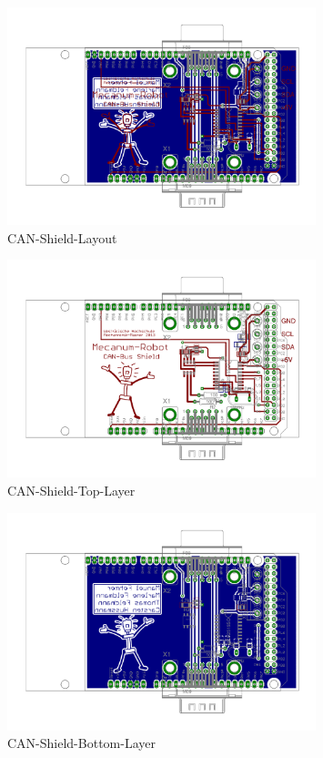 \begin{figure}[H]
\centering
 \includegraphics[width=0.8\textwidth]{Abbildungen/CAN-Shield-Layout} 
\caption[CAN-Shield-Layout]{CAN-Shield-Layout}
\label{fig:CAN-Shield-Layout}
\end{figure}

\begin{figure}[H]
\centering
 \includegraphics[width=0.8\textwidth]{Abbildungen/CAN-Shield-Layout-Top} 
\caption[CAN-Shield-Top-Layer]{CAN-Shield-Top-Layer}
\label{fig:CAN-Shield-Layout-Top}
\end{figure}

\begin{figure}[H]
\centering
 \includegraphics[width=0.8\textwidth]{Abbildungen/CAN-Shield-Layout-Bottom} 
\caption[CAN-Shield-Bottom-Layer]{CAN-Shield-Bottom-Layer}
\label{fig:CAN-Shield-Layout-Bottom}
\end{figure}

